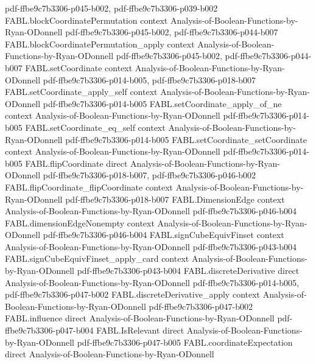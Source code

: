 \begin{theorem}
  {pdf-ffbe9c7b3306-p045-b002,
    pdf-ffbe9c7b3306-p039-b002}
\proofstep
  {FABL.blockCoordinatePermutation}
  {context}
  {Analysis-of-Boolean-Functions-by-Ryan-ODonnell}
  {pdf-ffbe9c7b3306-p045-b002,
    pdf-ffbe9c7b3306-p044-b007}
\proofstep
  {FABL.blockCoordinatePermutation_apply}
  {context}
  {Analysis-of-Boolean-Functions-by-Ryan-ODonnell}
  {pdf-ffbe9c7b3306-p045-b002,
    pdf-ffbe9c7b3306-p044-b007}
\proofstep
  {FABL.setCoordinate}
  {context}
  {Analysis-of-Boolean-Functions-by-Ryan-ODonnell}
  {pdf-ffbe9c7b3306-p014-b005,
    pdf-ffbe9c7b3306-p018-b007}
\proofstep
  {FABL.setCoordinate_apply_self}
  {context}
  {Analysis-of-Boolean-Functions-by-Ryan-ODonnell}
  {pdf-ffbe9c7b3306-p014-b005}
\proofstep
  {FABL.setCoordinate_apply_of_ne}
  {context}
  {Analysis-of-Boolean-Functions-by-Ryan-ODonnell}
  {pdf-ffbe9c7b3306-p014-b005}
\proofstep
  {FABL.setCoordinate_eq_self}
  {context}
  {Analysis-of-Boolean-Functions-by-Ryan-ODonnell}
  {pdf-ffbe9c7b3306-p014-b005}
\proofstep
  {FABL.setCoordinate_setCoordinate}
  {context}
  {Analysis-of-Boolean-Functions-by-Ryan-ODonnell}
  {pdf-ffbe9c7b3306-p014-b005}
\proofstep
  {FABL.flipCoordinate}
  {direct}
  {Analysis-of-Boolean-Functions-by-Ryan-ODonnell}
  {pdf-ffbe9c7b3306-p018-b007,
    pdf-ffbe9c7b3306-p046-b002}
\proofstep
  {FABL.flipCoordinate_flipCoordinate}
  {context}
  {Analysis-of-Boolean-Functions-by-Ryan-ODonnell}
  {pdf-ffbe9c7b3306-p018-b007}
\proofstep
  {FABL.DimensionEdge}
  {context}
  {Analysis-of-Boolean-Functions-by-Ryan-ODonnell}
  {pdf-ffbe9c7b3306-p046-b004}
\proofstep
  {FABL.dimensionEdgeNonempty}
  {context}
  {Analysis-of-Boolean-Functions-by-Ryan-ODonnell}
  {pdf-ffbe9c7b3306-p046-b004}
\proofstep
  {FABL.signCubeEquivFinset}
  {context}
  {Analysis-of-Boolean-Functions-by-Ryan-ODonnell}
  {pdf-ffbe9c7b3306-p043-b004}
\proofstep
  {FABL.signCubeEquivFinset_apply_card}
  {context}
  {Analysis-of-Boolean-Functions-by-Ryan-ODonnell}
  {pdf-ffbe9c7b3306-p043-b004}
\proofstep
  {FABL.discreteDerivative}
  {direct}
  {Analysis-of-Boolean-Functions-by-Ryan-ODonnell}
  {pdf-ffbe9c7b3306-p014-b005,
    pdf-ffbe9c7b3306-p047-b002}
\proofstep
  {FABL.discreteDerivative_apply}
  {context}
  {Analysis-of-Boolean-Functions-by-Ryan-ODonnell}
  {pdf-ffbe9c7b3306-p047-b002}
\proofstep
  {FABL.influence}
  {direct}
  {Analysis-of-Boolean-Functions-by-Ryan-ODonnell}
  {pdf-ffbe9c7b3306-p047-b004}
\proofstep
  {FABL.IsRelevant}
  {direct}
  {Analysis-of-Boolean-Functions-by-Ryan-ODonnell}
  {pdf-ffbe9c7b3306-p047-b005}
\proofstep
  {FABL.coordinateExpectation}
  {direct}
  {Analysis-of-Boolean-Functions-by-Ryan-ODonnell}

\end{theorem}
